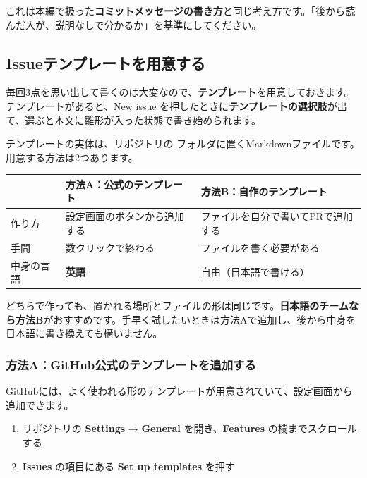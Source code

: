 これは本編で扱った\textbf{コミットメッセージの書き方}と同じ考え方です。「後から読んだ人が、説明なしで分かるか」を基準にしてください。

\subsection{Issueテンプレートを用意する}

毎回3点を思い出して書くのは大変なので、\textbf{テンプレート}を用意しておきます。テンプレートがあると、New issue を押したときに\textbf{テンプレートの選択肢}が出て、選ぶと本文に雛形が入った状態で書き始められます。

テンプレートの実体は、リポジトリの  フォルダに置くMarkdownファイルです。用意する方法は2つあります。

\begin{center}
\begin{tabularx}{\linewidth}{@{}>{\raggedright\arraybackslash}p{4.4cm} X X@{}}
\toprule
 & 方法A：公式のテンプレート & 方法B：自作のテンプレート \\
\midrule
作り方 & 設定画面のボタンから追加する & ファイルを自分で書いてPRで追加する \\
手間 & 数クリックで終わる & ファイルを書く必要がある \\
中身の言語 & \textbf{英語} & 自由（日本語で書ける） \\
\bottomrule
\end{tabularx}
\end{center}

\medskip

どちらで作っても、置かれる場所とファイルの形は同じです。\textbf{日本語のチームなら方法B}がおすすめです。手早く試したいときは方法Aで追加し、後から中身を日本語に書き換えても構いません。

\subsubsection{方法A：GitHub公式のテンプレートを追加する}

GitHubには、よく使われる形のテンプレートが用意されていて、設定画面から追加できます。

\begin{enumerate}[leftmargin=1.6em]
  \item リポジトリの \textbf{Settings} → \textbf{General} を開き、\textbf{Features} の欄までスクロールする
  \item \textbf{Issues} の項目にある \textbf{Set up templates} を押す
\end{enumerate}


